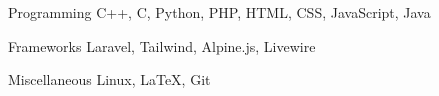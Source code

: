 
\begin{cvskills}
  \cvskill
  {Programming}
  {C++, C, Python, PHP, HTML, CSS, JavaScript, Java}

  \cvskill
  {Frameworks}
  {Laravel, Tailwind, Alpine.js, Livewire}

  \cvskill
  {Miscellaneous}
  {Linux, \LaTeX, Git}
\end{cvskills}
